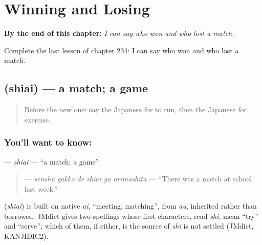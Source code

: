 
\chapter{Winning and Losing}
\label{ch:ja-winning-and-losing}

\begin{chapteropening}
\textbf{By the end of this chapter:} \emph{I can say who won and who lost a match.}

Complete the last lesson of chapter 234: I can say who won and who lost a match.
\end{chapteropening}

\section[\texorpdfstring{\ja{しあい} (shiai)}{しあい (shiai)}]{ (shiai) — a match; a game}

\label{lesson:JA-C234-shiai}



\begin{quote}
Before the new one: say the Japanese for to run, then the Japanese for exercise.
\end{quote}

\subsection*{You'll want to know: }
\textbf{} — \emph{shiai} — \textquotedblleft{}a match; a game\textquotedblright{}.

\begin{quote}
\textbf{   } — \emph{senshū gakkō de shiai ga arimashita} — \textquotedblleft{}There was a match at school last week.\textquotedblright{}
\end{quote}

\begin{cousinweb}
\textbf{} (\emph{shiai}) is built on native \emph{ai}, \textquotedblleft{}meeting, matching\textquotedblright{}, from \emph{au}, inherited rather than borrowed. JMdict gives two spellings whose first characters, read \emph{shi}, mean \textquotedblleft{}try\textquotedblright{} and \textquotedblleft{}serve\textquotedblright{}; which of them, if either, is the source of \emph{shi} is not settled (JMdict, KANJIDIC2).
\end{cousinweb}

